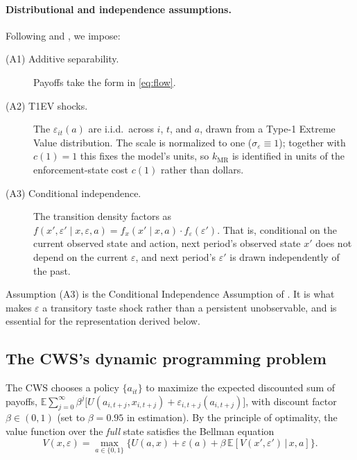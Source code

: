 \documentclass{article}
\begin{document}
\paragraph{Distributional and independence assumptions.} Following
\citet{rust1987optimal} and \citet{hotz1993conditional}, we impose:
\begin{description}
\item[(A1) Additive separability.] Payoffs take the form in
      \eqref{eq:flow}.
\item[(A2) T1EV shocks.] The $\varepsilon_{it}(a)$ are i.i.d.\ across $i$,
      $t$, and $a$, drawn from a Type-1 Extreme Value distribution. The scale
      is normalized to one ($\sigma_\varepsilon \equiv 1$); together with
      $c(1) = 1$ this fixes the model's units, so $k_{\text{MR}}$ is identified
      in units of the enforcement-state cost $c(1)$ rather than dollars.
\item[(A3) Conditional independence.] The transition density factors as
      $f(x', \varepsilon' \mid x, \varepsilon, a) = f_x(x' \mid x, a)
      \cdot f_\varepsilon(\varepsilon')$. That is, conditional on the current
      observed state and action, next period's observed state $x'$ does not
      depend on the current $\varepsilon$, and next period's $\varepsilon'$ is
      drawn independently of the past.
\end{description}
Assumption (A3) is the Conditional Independence Assumption of
\citet{rust1987optimal}. It is what makes $\varepsilon$ a transitory taste
shock rather than a persistent unobservable, and is essential for the
representation derived below.

\subsection{The CWS's dynamic programming problem}

The CWS chooses a policy $\{a_{it}\}$ to maximize the expected
discounted sum of payoffs, $\mathbb{E}\sum_{j=0}^{\infty} \beta^{j}
\big[ U(a_{i,t+j}, x_{i,t+j}) + \varepsilon_{i,t+j}(a_{i,t+j}) \big]$,
with discount factor $\beta \in (0, 1)$ (set to $\beta = 0.95$ in
estimation). By the principle of optimality, the value function over the
\emph{full} state satisfies the Bellman equation
\begin{equation}
V(x, \varepsilon) = \max_{a \in \{0, 1\}} \Big\{
U(a, x) + \varepsilon(a) + \beta \, \mathbb{E}\!\left[ V(x', \varepsilon')
\,\big|\, x, a \right] \Big\}.
\label{eq:bellman_full}
\end{equation}
\end{document}
